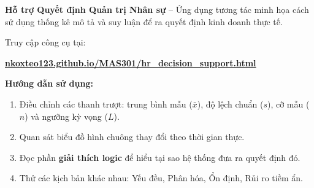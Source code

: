 \documentclass[a4paper,12pt]{article}
\theoremstyle{remark}
\begin{document}
\begin{tcolorbox}[
    colback=blue!3,
    colframe=maincolor,
    title=\faLaptop\ Công cụ thực hành trực tuyến,
    fonttitle=\bfseries,
    rounded corners,
    boxrule=1pt
]
\textbf{Hỗ trợ Quyết định Quản trị Nhân sự} -- Ứng dụng tương tác minh họa cách sử dụng thống kê mô tả và suy luận để ra quyết định kinh doanh thực tế.

\vspace{0.3cm}
Truy cập công cụ tại:

\begin{center}
    \Large\textbf{\href{https://nkoxteo123.github.io/MAS301/hr_decision_support.html}{\textcolor{maincolor}{nkoxteo123.github.io/MAS301/hr\_decision\_support.html}}}
\end{center}

\vspace{0.3cm}
\textbf{Hướng dẫn sử dụng:}
\begin{enumerate}
    \item Điều chỉnh các thanh trượt: trung bình mẫu (\(\bar{x}\)), độ lệch chuẩn (\(s\)), cỡ mẫu (\(n\)) và ngưỡng kỳ vọng (\(L\)).
    \item Quan sát biểu đồ hình chuông thay đổi theo thời gian thực.
    \item Đọc phần \textbf{giải thích logic} để hiểu tại sao hệ thống đưa ra quyết định đó.
    \item Thử các kịch bản khác nhau: Yếu đều, Phân hóa, Ổn định, Rủi ro tiềm ẩn.
\end{enumerate}
\end{tcolorbox}
\end{document}
